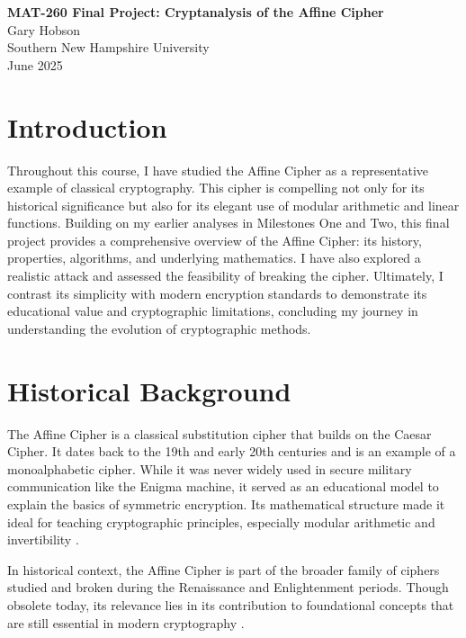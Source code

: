 \documentclass[12pt]{article}
\begin{document}
\begin{center}
    \textbf{\Large MAT-260 Final Project: Cryptanalysis of the Affine Cipher} \\
    \vspace{0.5cm}
    Gary Hobson \\
    Southern New Hampshire University \\
    June 2025
\end{center}

\thispagestyle{empty}

\clearpage

\section*{Introduction}
Throughout this course, I have studied the Affine Cipher as a representative example of classical cryptography. This cipher is compelling not only for its historical significance but also for its elegant use of modular arithmetic and linear functions. Building on my earlier analyses in Milestones One and Two, this final project provides a comprehensive overview of the Affine Cipher: its history, properties, algorithms, and underlying mathematics. I have also explored a realistic attack and assessed the feasibility of breaking the cipher. Ultimately, I contrast its simplicity with modern encryption standards to demonstrate its educational value and cryptographic limitations, concluding my journey in understanding the evolution of cryptographic methods.

\section*{Historical Background}
The Affine Cipher is a classical substitution cipher that builds on the Caesar Cipher. It dates back to the 19th and early 20th centuries and is an example of a monoalphabetic cipher. While it was never widely used in secure military communication like the Enigma machine, it served as an educational model to explain the basics of symmetric encryption. Its mathematical structure made it ideal for teaching cryptographic principles, especially modular arithmetic and invertibility \cite{book:trappe}.

In historical context, the Affine Cipher is part of the broader family of ciphers studied and broken during the Renaissance and Enlightenment periods. Though obsolete today, its relevance lies in its contribution to foundational concepts that are still essential in modern cryptography \cite{book:singh}.
\end{document}
